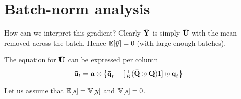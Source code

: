\section{Batch-norm analysis}

How can we interpret this gradient?
Clearly $\boldsymbol{\mathbf{\bar{Y}}}$ is simply $\boldsymbol{\mathbf{\bar{U}}}$ with the mean removed across the batch.
Hence $\mathbb{E}[\bar{y}] = 0$ (with large enough batches).

The equation for $\boldsymbol{\mathbf{\bar{U}}}$ can be expressed per column
\begin{align}
\boldsymbol{\mathbf{\bar{u}}}_{t} & = \boldsymbol{\mathbf{a}} \odot \left\{ \boldsymbol{\mathbf{\bar{q}}}_{t} - [\tfrac{1}{B} (\boldsymbol{\mathbf{\bar{Q}}} \odot \boldsymbol{\mathbf{Q}}) 1] \odot \boldsymbol{\mathbf{q}}_{t} \right\}
\end{align}

Let us assume that $\mathbb{E}[s] = \mathbb{V}[y]$ and $\mathbb{V}[s] = 0$.


